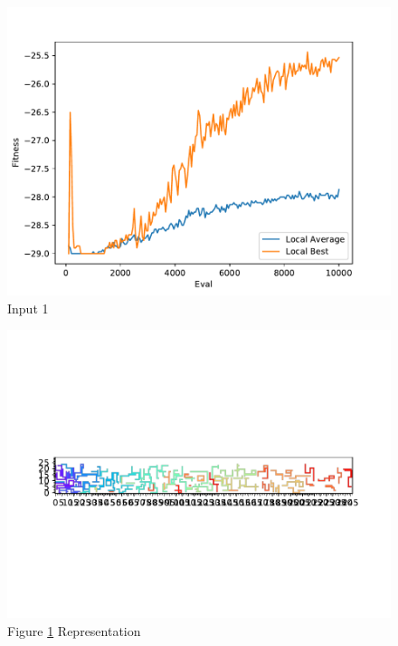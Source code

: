 \documentclass{standalone}
\begin{document}
\begin{figure}[!htb]
	\caption{Input 1}
	\label{fig:graph_1015}
	\includegraphics[width=\textwidth]{../graphs/graphs/1015.pdf}
\end{figure}


\begin{figure}[!htb]
	\caption{Figure \ref{fig:graph_1015} Representation}
	\label{fig:picture_1015}
	\includegraphics[width=\textwidth]{../graphs/picture/1015.pdf}
\end{figure}
\end{document}
